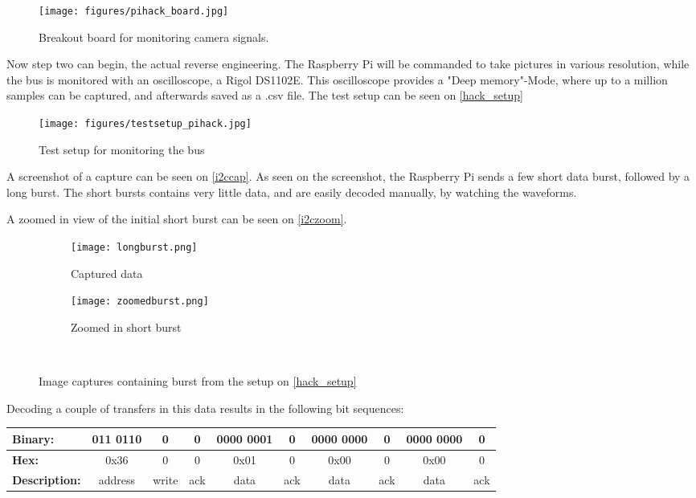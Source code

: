 \begin{figure}[H]
	\centering
	\texttt{[image: figures/pihack\_board.jpg]}
	\caption{Breakout board for monitoring camera signals.}
	\label{camerabreakout}
\end{figure}

Now step two can begin, the actual reverse engineering. The Raspberry Pi will be commanded to take pictures in various resolution, while the \iic bus is monitored with an oscilloscope, a Rigol DS1102E. This oscilloscope provides a "Deep memory"-Mode, where up to a million samples can be captured, and afterwards saved as a .csv file. The test setup can be seen on \autoref{hack_setup}

\begin{figure}[H]
	\centering
	\texttt{[image: figures/testsetup\_pihack.jpg]}
	\caption{Test setup for monitoring the \iic bus}
	\label{hack_setup}
\end{figure}

A screenshot of a capture can be seen on \autoref{i2ccap}. As seen on the screenshot, the Raspberry Pi sends a few short data burst, followed by a long burst. The short bursts contains very little data, and are easily decoded manually, by watching the waveforms.

A zoomed in view of the initial short burst can be seen on \autoref{i2czoom}.

\begin{figure}[H]
	\centering
	\begin{subfigure}{.45\textwidth}
		\centering
		\texttt{[image: longburst.png]}
		\caption{Captured \iic data}
		\label{i2ccap}
	\end{subfigure}
	\hfill
	\begin{subfigure}{.45\textwidth}
		\centering
		\texttt{[image: zoomedburst.png]}
		\caption{Zoomed in short burst}
		\label{i2czoom}
	\end{subfigure}\\
	\caption{Image captures containing \iic burst from the setup on \autoref{hack_setup}}
	\label{I2C_burst}
\end{figure}

Decoding a couple of transfers in this data results in the following bit sequences:

\begin{tabular}{|l|c|c|c|c|c|c|c|c|c|}
\hline 
\textbf{Binary:} & 011 0110 & 0 & 0 & 0000 0001 & 0 & 0000 0000 & 0 & 0000 0000 & 0 \\ 
\hline 
\textbf{Hex:} & 0x36 & 0 & 0 & 0x01 & 0 & 0x00 & 0 & 0x00 & 0 \\ 
\hline 
\textbf{Description:} & address & write & ack & data & ack & data & ack & data & ack \\ 
\hline 
\end{tabular} 

